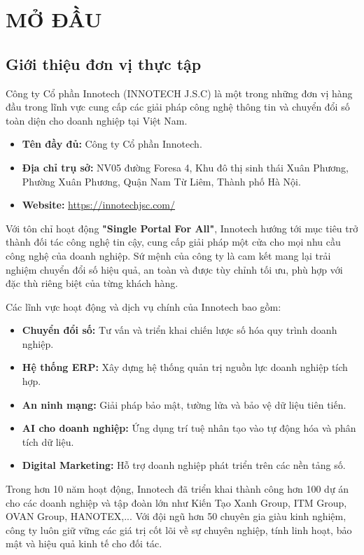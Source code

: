 \documentclass[13pt,a4paper,oneside]{extreport}
\numberwithin{equation}{chapter}
\numberwithin{figure}{chapter}
\numberwithin{table}{chapter}
\begin{document}
\chapter*{MỞ ĐẦU}

\section*{Giới thiệu đơn vị thực tập}
Công ty Cổ phần Innotech (INNOTECH J.S.C) là một trong những đơn vị hàng đầu trong lĩnh vực cung cấp các giải pháp công nghệ thông tin và chuyển đổi số toàn diện cho doanh nghiệp tại Việt Nam.

\begin{itemize}
    \item \textbf{Tên đầy đủ:} Công ty Cổ phần Innotech.
    \item \textbf{Địa chỉ trụ sở:} NV05 đường Foresa 4, Khu đô thị sinh thái Xuân Phương, Phường Xuân Phương, Quận Nam Từ Liêm, Thành phố Hà Nội.
    \item \textbf{Website:} \url{https://innotechjsc.com/}
\end{itemize}

Với tôn chỉ hoạt động \textbf{"Single Portal For All"}, Innotech hướng tới mục tiêu trở thành đối tác công nghệ tin cậy, cung cấp giải pháp một cửa cho mọi nhu cầu công nghệ của doanh nghiệp. Sứ mệnh của công ty là cam kết mang lại trải nghiệm chuyển đổi số hiệu quả, an toàn và được tùy chỉnh tối ưu, phù hợp với đặc thù riêng biệt của từng khách hàng.

Các lĩnh vực hoạt động và dịch vụ chính của Innotech bao gồm:
\begin{itemize}
    \item \textbf{Chuyển đổi số:} Tư vấn và triển khai chiến lược số hóa quy trình doanh nghiệp.
    \item \textbf{Hệ thống ERP:} Xây dựng hệ thống quản trị nguồn lực doanh nghiệp tích hợp.
    \item \textbf{An ninh mạng:} Giải pháp bảo mật, tường lửa và bảo vệ dữ liệu tiên tiến.
    \item \textbf{AI cho doanh nghiệp:} Ứng dụng trí tuệ nhân tạo vào tự động hóa và phân tích dữ liệu.
    \item \textbf{Digital Marketing:} Hỗ trợ doanh nghiệp phát triển trên các nền tảng số.
\end{itemize}

Trong hơn 10 năm hoạt động, Innotech đã triển khai thành công hơn 100 dự án cho các doanh nghiệp và tập đoàn lớn như Kiến Tạo Xanh Group, ITM Group, OVAN Group, HANOTEX,... Với đội ngũ hơn 50 chuyên gia giàu kinh nghiệm, công ty luôn giữ vững các giá trị cốt lõi về sự chuyên nghiệp, tính linh hoạt, bảo mật và hiệu quả kinh tế cho đối tác.
\end{document}
